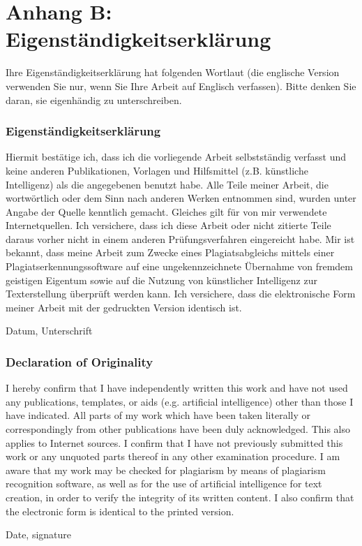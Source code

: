 \chapter*{Anhang B: Eigenständigkeitserklärung}
\label{app:eigenstaendigkeitserklaerung}

Ihre Eigenständigkeitserklärung hat folgenden Wortlaut (die englische Version verwenden Sie nur, wenn Sie Ihre Arbeit auf Englisch verfassen). Bitte denken Sie daran, sie eigenhändig zu unterschreiben.

\subsection*{Eigenständigkeitserklärung}

Hiermit bestätige ich, dass ich die vorliegende Arbeit selbstständig verfasst und keine anderen Publikationen, Vorlagen und Hilfsmittel (z.B. künstliche Intelligenz) als die angegebenen benutzt habe. Alle Teile meiner Arbeit, die wortwörtlich oder dem Sinn nach anderen Werken entnommen sind, wurden unter Angabe der Quelle kenntlich gemacht. Gleiches gilt für von mir verwendete Internetquellen. Ich versichere, dass ich diese Arbeit oder nicht zitierte Teile daraus vorher nicht in einem anderen Prüfungsverfahren eingereicht habe. Mir ist bekannt, dass meine Arbeit zum Zwecke eines Plagiatsabgleichs mittels einer Plagiatserkennungssoftware auf eine ungekennzeichnete Übernahme von fremdem geistigen Eigentum sowie auf die Nutzung von künstlicher Intelligenz zur Texterstellung überprüft werden kann. Ich versichere, dass die elektronische Form meiner Arbeit mit der gedruckten Version identisch ist.

Datum, Unterschrift

\subsection*{Declaration of Originality}

I hereby confirm that I have independently written this work and have not used any publications, templates, or aids (e.g. artificial intelligence) other than those I have indicated. All parts of my work which have been taken literally or correspondingly from other publications have been duly acknowledged. This also applies to Internet sources. I confirm that I have not previously submitted this work or any unquoted parts thereof in any other examination procedure. I am aware that my work may be checked for plagiarism by means of plagiarism recognition software, as well as for the use of artificial intelligence for text creation, in order to verify the integrity of its written content. I also confirm that the electronic form is identical to the printed version.

Date, signature